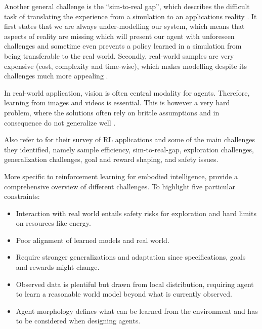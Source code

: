 \documentclass[twoside,11pt]{article}
\begin{document}
\begin{enumerate}
Another general challenge is the ``sim-to-real gap'', which describes the difficult task of translating the experience from a simulation to an applications reality \citep{ZagalJavierVallejos:2004:RealityGap}. It first states that we are always under-modelling our system, which means that aspects of reality are missing which will present our agent with unforeseen challenges and sometime even prevents a policy learned in a simulation from being transferable to the real world. Secondly, real-world samples are very expensive (cost, complexity and time-wise), which makes modelling despite its challenges much more appealing  \citep{KoberBagnellPeters:2013:RLRoboticsSurvey}.

In real-world application, vision is often central modality for agents. Therefore, learning from images and videos is essential. This is however a very hard problem, where the solutions often rely on brittle assumptions and in consequence do not generalize well \citep{TomarEtAl:2021:LearnPixelControlRepresentations}. 

Also refer to \citet{ibarz2021train} for their survey of RL applications and some of the main challenges they identified, namely sample efficiency, sim-to-real-gap, exploration challenges, generalization challenges, goal and reward shaping, and safety issues. 

More specific to reinforcement learning for embodied intelligence, \citet{RoyEtAl:2021:RLRoboticsChallenges} provide a comprehensive overview of different challenges. To highlight five particular constraints:
\begin{itemize}
    \item Interaction with real world entails safety risks for exploration and hard limits on resources like energy.
    \item Poor alignment of learned models and real world.
    \item Require stronger generalizations  and adaptation since specifications, goals and rewards might change.
    \item Observed data is plentiful but drawn from local distribution, requiring agent to learn a reasonable world model beyond  what is currently observed. 
    \item Agent morphology defines what can be learned from the environment and has to be considered when designing agents.
\end{itemize}


\end{enumerate}
\end{document}
